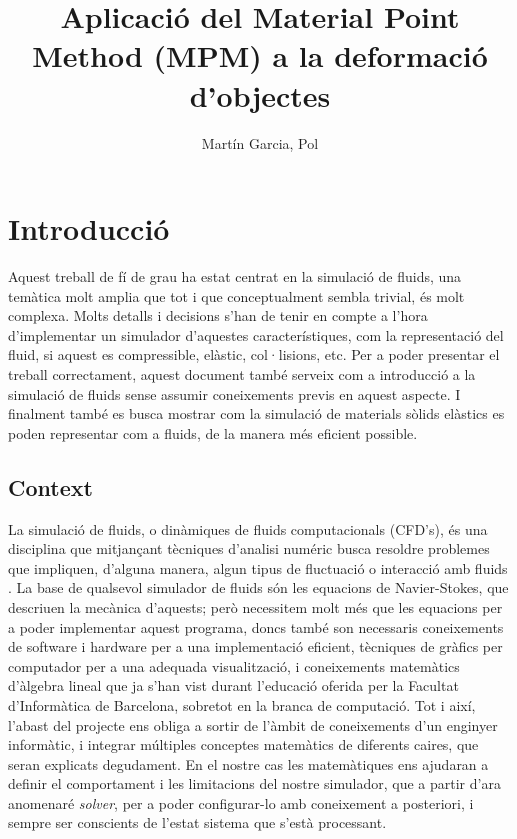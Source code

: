 \documentclass[a4paper]{article}
\title{Aplicació del Material Point Method (MPM) a la deformació d'objectes}
\author{Martín Garcia, Pol}
\date{\parbox{\linewidth}{\centering%
		\today\endgraf\bigskip
		Director: Susín Sánchez, Toni\endgraf \medskip
		Especialitat Computació \endgraf
		Facultat d'Informàtica de Barcelona}}
\begin{document}
	\maketitle
	\newpage
	

	
	\tableofcontents
	\newpage
	
	\section{Introducció}
	Aquest treball de fí de grau ha estat centrat en la simulació de fluids, una temàtica molt amplia que tot i que conceptualment sembla trivial, és molt complexa. Molts detalls i decisions s'han de tenir en compte a l'hora d'implementar un simulador d'aquestes característiques, com la representació del fluid, si aquest es compressible, elàstic, col·lisions, etc. \newline
	Per a poder presentar el treball correctament, aquest document també serveix com a introducció a la simulació de fluids sense assumir coneixements previs en aquest aspecte.
	I finalment també es busca mostrar com la simulació de materials sòlids elàstics es poden representar com a fluids, de la manera més eficient possible.\newline 

	\subsection{Context}
	La simulació de fluids, o dinàmiques de fluids computacionals (CFD's), és una disciplina que mitjançant tècniques d'analisi numéric busca resoldre problemes que impliquen, d'alguna manera, algun tipus de fluctuació o interacció amb fluids . \newline
	La base de qualsevol simulador de fluids són les equacions de Navier-Stokes, que descriuen la mecànica d'aquests; però necessitem molt més que les equacions per a poder implementar aquest programa, doncs també son necessaris coneixements de software i hardware per a una implementació eficient, tècniques de gràfics per computador per a una adequada visualització, i coneixements matemàtics d'àlgebra lineal que ja s'han vist durant l'educació oferida per la Facultat d'Informàtica de Barcelona, sobretot en la branca de computació. Tot i així, l'abast del projecte ens obliga a sortir de l'àmbit de coneixements d'un enginyer informàtic, i integrar múltiples conceptes matemàtics de diferents caires, que seran explicats degudament. \newline
	En el nostre cas les matemàtiques ens ajudaran a definir el comportament i les limitacions del nostre simulador, que a partir d'ara anomenaré \textit{solver}, per a poder configurar-lo amb coneixement a posteriori, i sempre ser conscients de l'estat sistema que s'està processant. \newline
	
\end{document}
